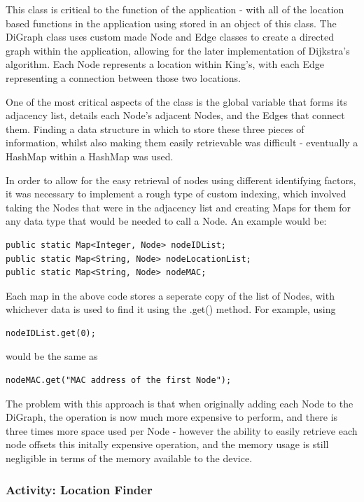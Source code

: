 \documentclass[11pt]{informatics-report}
\begin{document}
This class is critical to the function of the application - with all of the location based functions in the application using stored in an object of this class. The DiGraph class uses custom made Node and Edge classes to create a directed graph within the application, allowing for the later implementation of Dijkstra's algorithm. Each Node represents a location within King's, with each Edge representing a connection between those two locations.

One of the most critical aspects of the class is the global variable that forms its adjacency list, details each Node's adjacent Nodes, and the Edges that connect them. Finding a data structure in which to store these three pieces of information, whilst also making them easily retrievable was difficult - eventually a HashMap within a HashMap was used. 

In order to allow for the easy retrieval of nodes using different identifying factors, it was necessary to implement a rough type of custom indexing, which involved taking the Nodes that were in the adjacency list and creating Maps for them for any data type that would be needed to call a Node. An example would be:

\begin{verbatim}
public static Map<Integer, Node> nodeIDList;
public static Map<String, Node> nodeLocationList;
public static Map<String, Node> nodeMAC;  
\end{verbatim}

Each map in the above code stores a seperate copy of the list of Nodes, with whichever data is used to find it using the .get() method. For example, using 

\begin{verbatim}
nodeIDList.get(0);
\end{verbatim}
would be the same as

\begin{verbatim}
nodeMAC.get("MAC address of the first Node");
\end{verbatim}

The problem with this approach is that when originally adding each Node to the DiGraph, the operation is now much more expensive to perform, and there is three times more space used per Node - however the ability to easily retrieve each node offsets this initally expensive operation, and the memory usage is still negligible in terms of the memory available to the device.

\subsubsection{Activity: Location Finder}
\end{document}
